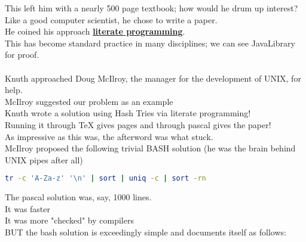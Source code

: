 \documentclass[../../lecture_notes.tex]{subfiles}
\begin{document}
\noindent This left him with a nearly 500 page textbook; how would he drum up interest?\\
Like a good computer scientist, he chose to write a paper.\\
He coined his approach \textbf{\underline{literate programming}}.\\
This has become standard practice in many disciplines; we can see JavaLibrary for proof.\\ 
\\
Knuth approached Doug McIlroy, the manager for the development of UNIX, for help.\\
McIlroy suggested our problem as an example\\
Knuth wrote a solution using Hash Tries via literate programming!\\
Running it through TeX gives pages and through pascal gives the paper!\\
\newpage
\noindent As impressive as this was, the afterword was what stuck.\\
McIlroy proposed the following trivial BASH solution (he was the brain behind UNIX pipes after all)
	\begin{lstlisting}[language=bash]  
	tr -c 'A-Za-z' '\n' | sort | uniq -c | sort -rn
	\end{lstlisting}
The pascal solution was, say, 1000 lines.\\
\indent It was faster\\
\indent It was more "checked" by compilers\\
BUT the bash solution is exceedingly simple and documents itself as follows:
\begin{center}\end{center}
\end{document}
